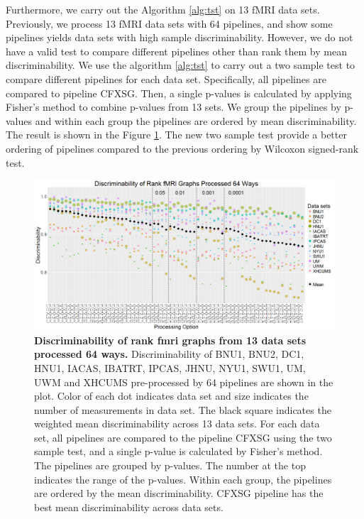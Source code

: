 \documentclass[simplex.tex]{subfiles}
\begin{document}
Furthermore, we carry out the Algorithm \ref{alg:tst} on 13 fMRI data sets. Previously, we process 13 fMRI data sets with 64 pipelines, and show some pipelines yields data
sets with high sample discriminability. However, we do not have a valid test to compare different pipelines other than rank them by mean discriminability. We use the algorithm \ref{alg:tst} to carry out a two sample test to compare different pipelines for each data set. Specifically, all pipelines are compared to pipeline CFXSG. Then, a single p-values is calculated by applying Fisher's method to combine p-values from 13 sets. We group the pipelines by p-values and within each group the pipelines are ordered by mean discriminability. The result is shown in the Figure \ref{fig:pipes}. The new two sample test provide a better ordering of pipelines compared to the previous ordering by Wilcoxon signed-rank test.

\begin{figure}[h!]
	\begin{cframed}
		\centering
		\includegraphics[width=\textwidth]{../../figs/fmri_rank_pv_v2.png}
		\caption{
			{\bf Discriminability of rank fmri graphs from 13 data sets processed 64 ways.}  Discriminability of BNU1, BNU2, DC1, HNU1, IACAS, IBATRT, IPCAS, JHNU, NYU1, SWU1, UM, UWM and XHCUMS pre-processed by 64 pipelines are shown in the plot. Color of each dot indicates data set and size indicates the number of measurements in data set. The black square indicates the weighted mean discriminability across 13 data sets.  For each data set, all pipelines are compared to the pipeline CFXSG using the two sample test, and a single p-value is calculated by Fisher's method. The pipelines are grouped by p-values. The number at the top indicates the range of the p-values. Within each group, the pipelines are ordered by the mean discriminability. CFXSG pipeline has the best mean discriminability across data sets.}
		\label{fig:pipes}
	\end{cframed}
\end{figure}
\end{document}
